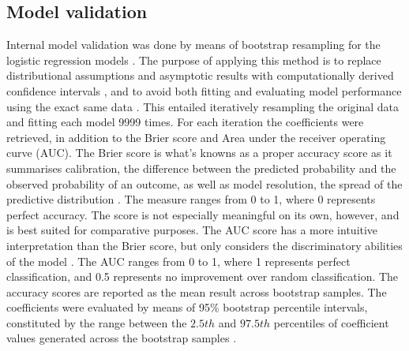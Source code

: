 \documentclass[12pt, a4paper]{article}
\begin{document}
\subsection{Model validation}
Internal model validation was done by means of bootstrap resampling for the logistic regression models \citep[][]{kvamme1988, verhagen2009}. The purpose of applying this method is to replace distributional assumptions and asymptotic results with computationally derived confidence intervals \citep[][605]{fox2008}, and to avoid both fitting and evaluating model performance using the exact same data \citep[][249--254]{hastie2009}. This entailed iteratively resampling the original data and fitting each model 9999 times. For each iteration the coefficients were retrieved, in addition to the Brier score and Area under the receiver operating curve (AUC). The Brier score is what's knowns as a proper accuracy score as it summarises calibration, the difference between the predicted probability and the observed probability of an outcome, as well as model resolution, the spread of the predictive distribution \citep{rufibach2010}. The measure ranges from 0 to 1, where 0 represents perfect accuracy. The score is not especially meaningful on its own, however, and is best suited for comparative purposes. The AUC score has a more intuitive interpretation than the Brier score, but only considers the discriminatory abilities of the model \citep[173--182]{hosmer2013}. The AUC ranges from 0 to 1, where 1 represents perfect classification, and 0.5 represents no improvement over random classification. The accuracy scores are reported as the mean result across bootstrap samples. The coefficients were evaluated by means of 95\% bootstrap percentile intervals, constituted by the range between the $2.5th$ and $97.5th$ percentiles of coefficient values generated across the bootstrap samples \citep[][595]{fox2008}.\par
\end{document}
